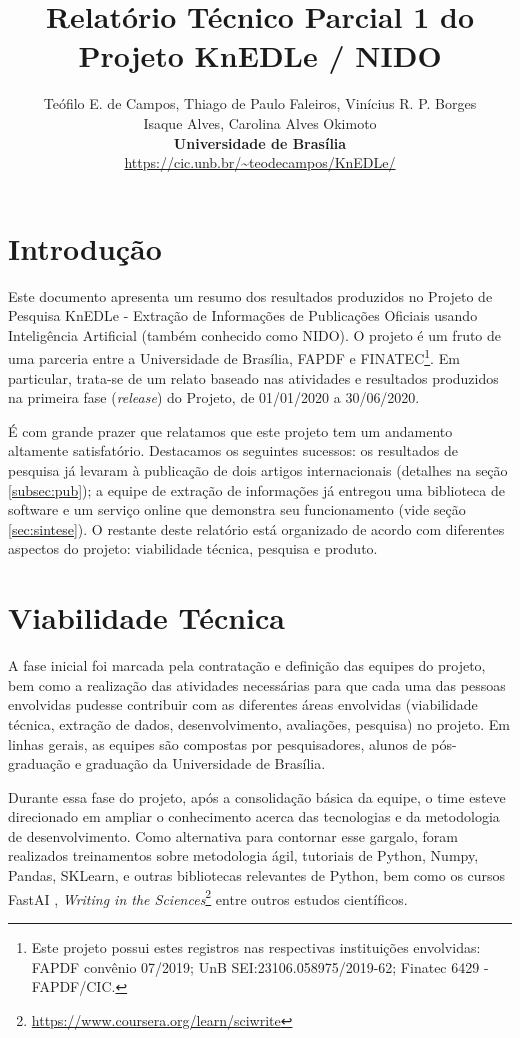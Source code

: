 \documentclass[12pt]{article}
\title{Relatório Técnico Parcial 1 do \\ 
Projeto KnEDLe / NIDO}
\author{Teófilo E. de Campos, Thiago de Paulo Faleiros, Vinícius R. P. Borges\\
Isaque Alves, Carolina Alves Okimoto\\
{\bf Universidade de Brasília}\\
\normalsize{\url{https://cic.unb.br/~teodecampos/KnEDLe/}}}
\begin{document}
\maketitle
\section{Introdução}
\label{sec:introducao}

Este documento apresenta um resumo dos resultados produzidos no Projeto de Pesquisa KnEDLe - Extração de Informações de Publicações Oficiais usando Inteligência Artificial (também conhecido como NIDO). O projeto é um fruto de uma parceria entre a Universidade de Brasília, FAPDF e FINATEC\footnote{Este projeto possui estes registros nas respectivas instituições envolvidas: FAPDF convênio 07/2019; UnB SEI:23106.058975/2019-62; Finatec 6429 - FAPDF/CIC.}. Em particular, trata-se de um relato baseado nas atividades e resultados produzidos na primeira fase ({\em release}) do Projeto, de 01/01/2020 a 30/06/2020. 

É com grande prazer que relatamos que este projeto tem um andamento altamente satisfatório. Destacamos os seguintes sucessos:
os resultados de pesquisa já levaram à publicação de dois artigos internacionais (detalhes na seção \ref{subsec:pub});
a equipe de extração de informações já entregou uma biblioteca de software e um serviço online que demonstra seu funcionamento (vide seção \ref{sec:sintese}).
O restante deste relatório está organizado de acordo com diferentes aspectos do projeto: viabilidade técnica, pesquisa e produto.

\section{Viabilidade Técnica}
\label{sec:viabilidade}

A fase inicial foi marcada pela contratação e definição das equipes do projeto, bem como a realização das atividades necessárias para que cada uma das pessoas envolvidas pudesse contribuir com as diferentes áreas envolvidas (viabilidade técnica, extração de dados, desenvolvimento, avaliações, pesquisa) no projeto. Em linhas gerais, as equipes são compostas por pesquisadores, alunos de pós-graduação e graduação da Universidade de Brasília.

Durante essa fase do projeto, após a consolidação básica da equipe, o time esteve direcionado em ampliar o conhecimento acerca das tecnologias e da metodologia de desenvolvimento. Como alternativa para contornar esse gargalo, foram realizados treinamentos sobre metodologia ágil, tutoriais de Python, Numpy, Pandas, SKLearn, e outras bibliotecas relevantes de Python, bem como os cursos FastAI \cite{howard_fastai2018,Howard18}, {\em Writing in the Sciences}\footnote{\url{https://www.coursera.org/learn/sciwrite}} entre outros estudos científicos.
\end{document}
